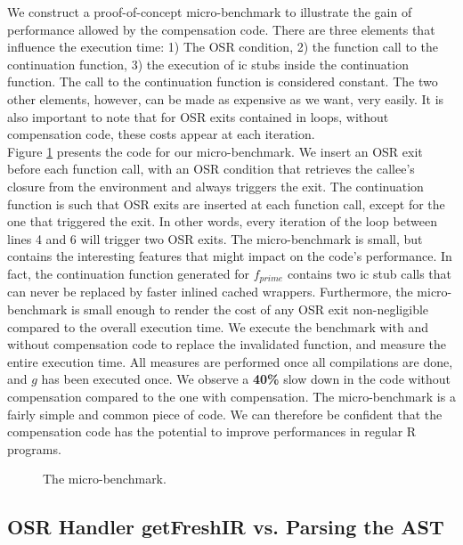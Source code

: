 We construct a proof-of-concept micro-benchmark to illustrate the gain of performance allowed by the compensation code. 
There are three elements that influence the execution time: 1) The OSR condition, 2) the function call to the continuation function, 3) the execution of ic stubs inside the continuation function.
The call to the continuation function is considered constant.
The two other elements, however, can be made as expensive as we want, very easily.
It is also important to note that for OSR exits contained in loops, without compensation code, these costs appear at each iteration.\\

Figure \ref{fig:microbenchmark} presents the code for our micro-benchmark. 
We insert an OSR exit before each function call, with an OSR condition that retrieves the callee's closure from the environment and always triggers the exit.
The continuation function is such that OSR exits are inserted at each function call, except for the one that triggered the exit.
In other words, every iteration of the loop between lines 4 and 6 will trigger two OSR exits.
The micro-benchmark is small, but contains the interesting features that might impact on the code's performance.
In fact, the continuation function generated for $f_{prime}$ contains two ic stub calls that can never be replaced by faster inlined cached wrappers.
Furthermore, the micro-benchmark is small enough to render the cost of any OSR exit non-negligible compared to the overall execution time.
We execute the benchmark with and without compensation code to replace the invalidated function, and measure the entire execution time.
All measures are performed once all compilations are done, and $g$ has been executed once.
We observe a \textbf{40\%} slow down in the code without compensation compared to the one with compensation.
The micro-benchmark is a fairly simple and common piece of code.
We can therefore be confident that the compensation code has the potential to improve performances in regular R programs.
\\

\begin{figure}[h]
\caption{The micro-benchmark.}
\label{fig:microbenchmark}
\end{figure}


\subsection{OSR Handler getFreshIR vs. Parsing the AST}\label{section:getfreshtest}


